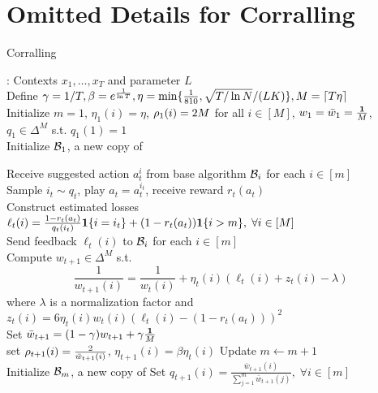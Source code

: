\section{Omitted Details for Corralling \bistro}\label{app:BISTRO+}

\LinesNumbered
\SetAlgoVlined
\setcounter{AlgoLine}{0}
\begin{algorithm}[H]
\DontPrintSemicolon
\caption{Corralling \bistro}
\label{alg:corralling_BISTRO+}
: Contexts $x_1, \ldots, x_T$ and parameter $L$ \\
\nl Define $\gamma = 1/T, \beta = e^{\frac{1}{\ln T}},  \eta = \min\{ \frac{1}{810}, \sqrt{T/\ln N}/(LK)\}, M = \lceil T\eta\rceil $\\
\nl Initialize $m=1$, $\eta_{1}(i) = \eta$, $\rho_{1}(i) = 2M$ for all $i \in [M]$, $w_1 = \bar{w}_1 = \frac{\boldsymbol{1}}{M}$,
$q_1 \in \Delta^M$ s.t. $q_1(1) = 1 $ \\
\nl Initialize ${{\cal{B}}_{1}}$, a new copy of \bistro

\nl {} {
\nl    Receive suggested action $a_t^{i}$ from base algorithm ${{\cal{B}}_{i}}$	 for each $i \in [m]$ \\
\nl    Sample $i_t \sim q_t$, play $a_t = a_t^{i_t}$, receive reward $r_t(a_t)$  \\
\nl    Construct estimated losses $\ell_t(i) = \frac{1-r_t(a_t)}{q_t(i_t)}\boldsymbol{1}\{i=i_t\} + (1-r_t(a_t))\boldsymbol{1}\{i > m\},\; \forall i \in [M]$  \label{line:virtual_costs}\\
\nl    Send feedback $\ell_t(i)$ to ${{\cal{B}}_{i}}$ for each $i \in [m]$ \\
\nl    Compute $w_{t+1} \in \Delta^M$ s.t. \[\frac{1}{w_{t+1}(i)} = \frac{1}{w_{t}(i)} + \eta_{t}(i) (\ell_{t}(i) + z_t(i) - \lambda)\] 
      where $\lambda$ is a normalization factor and $z_t(i) = 6\eta_t(i)w_t(i)(\ell_t(i) - (1-r_t(a_t)))^2$ \label{line:LB-OMD} \label{line:Broad-OMD}\\
\nl    Set $\bar{w}_{t+1} = (1 - \gamma) w_{t+1} + \gamma \frac{\boldsymbol{1}}{M}$   \\
\nl    {} {
\nl        {} {set $\rho_{t+1}(i) = \frac{2}{\bar{w}_{t+1}(i)}$, $\eta_{t+1}(i) = \beta\eta_{t}(i)$}
\nl        {}  
    }
\nl    {} {
\nl        Update $m \leftarrow m + 1$ \\
\nl        Initialize ${{\cal{B}}_{m}}$, a new copy of \bistro
    }
\nl    Set $q_{t+1}(i) = \frac{\bar{w}_{t+1}(i)}{\sum_{j=1}^m \bar{w}_{t+1}(j)}, \; \forall i \in [m]$
}
\end{algorithm}

